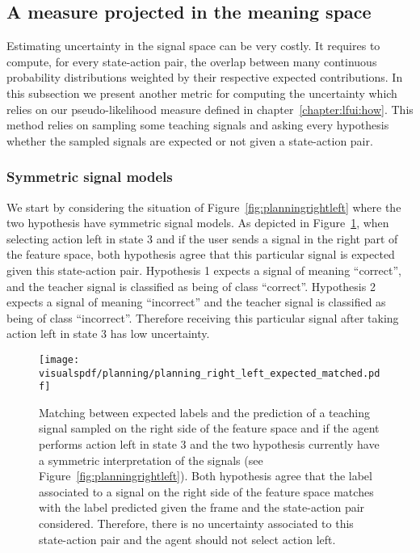 \subsection{A measure projected in the meaning space}
\label{chapter:planning:uncertiantyprojected}

Estimating uncertainty in the signal space can be very costly. It requires to compute, for every state-action pair, the overlap between many continuous probability distributions weighted by their respective expected contributions. In this subsection we present another metric for computing the uncertainty which relies on our pseudo-likelihood measure defined in chapter~\ref{chapter:lfui:how}. This method relies on sampling some teaching signals and asking every hypothesis whether the sampled signals are expected or not given a state-action pair.

\subsubsection*{Symmetric signal models}

We start by considering the situation of Figure~\ref{fig:planningrightleft} where the two hypothesis have symmetric signal models. As depicted in Figure~\ref{fig:uncertaintymeaningrightleftexpectedleft}, when selecting action left in state 3 and if the user sends a signal in the right part of the feature space, both hypothesis agree that this particular signal is expected given this state-action pair. Hypothesis 1 expects a signal of meaning ``correct'', and the teacher signal is classified as being of class ``correct''. Hypothesis 2 expects a signal of meaning ``incorrect'' and the teacher signal is classified as being of class ``incorrect''. Therefore receiving this particular signal after taking action left in state 3 has low uncertainty.

\begin{figure}[!htbp]
  \centering
  \texttt{[image: \\visualspdf/planning/planning\_right\_left\_expected\_matched.pdf]}
  \caption{Matching between expected labels and the prediction of a teaching signal sampled on the right side of the feature space and if the agent performs action left in state 3 and the two hypothesis currently have a symmetric interpretation of the signals (see Figure~\ref{fig:planningrightleft}). Both hypothesis agree that the label associated to a signal on the right side of the feature space matches with the label predicted given the frame and the state-action pair considered. Therefore, there is no uncertainty associated to this state-action pair and the agent should not select action left.}
  \label{fig:uncertaintymeaningrightleftexpectedleft}
\end{figure}


